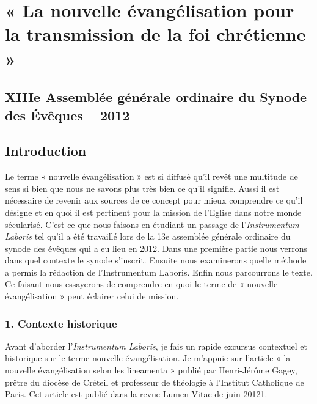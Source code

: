  

\chapter{« La nouvelle évangélisation pour la transmission de la foi chrétienne »}
\section{XIIIe Assemblée générale ordinaire du Synode des Évêques – 2012}
\section{Introduction}
Le terme « nouvelle évangélisation » est si diffusé qu’il revêt une multitude de sens si bien que nous
ne savons plus très bien ce qu’il signifie. Aussi il est nécessaire de revenir aux sources de ce concept
pour mieux comprendre ce qu’il désigne et en quoi il est pertinent pour la mission de l’Eglise dans
notre monde sécularisé. C’est ce que nous faisons en étudiant un passage de l’\textit{Instrumentum Laboris}
tel qu’il a été travaillé lors de la 13e assemblée générale ordinaire du synode des évêques qui a eu lieu
en 2012.
Dans une première partie nous verrons dans quel contexte le synode s’inscrit. Ensuite nous
examinerons quelle méthode a permis la rédaction de l’Instrumentum Laboris. Enfin nous
parcourrons le texte. Ce faisant nous essayerons de comprendre en quoi le terme de « nouvelle
évangélisation » peut éclairer celui de mission.
\subsection{1. Contexte historique}
Avant d’aborder l’\textit{Instrumentum Laboris}, je fais un rapide excursus contextuel et historique sur le
terme nouvelle évangélisation. Je m’appuie sur l’article « la nouvelle évangélisation selon les
lineamenta » publié par Henri-Jérôme Gagey, prêtre du diocèse de Créteil et professeur de théologie
à l’Institut Catholique de Paris. Cet article est publié dans la revue Lumen Vitae de juin 20121.

